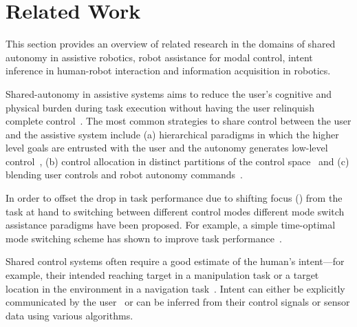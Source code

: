 \documentclass[natbib, twocolumn]{svjour3}          %
\begin{document}
\section{Related Work}\label{sec:related-work}
This section provides an overview of related research in the domains of shared autonomy in assistive robotics, robot assistance for modal control, intent inference in human-robot interaction and information acquisition in robotics. 

Shared-autonomy in assistive systems aims to reduce the user's cognitive and physical burden during task execution without having the user relinquish complete control~\citep{philips2007adaptive, demeester2008user, gopinath2017human, muelling2017autonomy}. The most common strategies to share control between the user and the assistive system include (a) hierarchical paradigms in which the higher level goals are entrusted with the user and the autonomy generates low-level control~\citep{tsui2011want, kim2010relationship, kim2012autonomy}, (b) control allocation in distinct partitions of the control space~\citep{driessen2005collaborative} and (c) blending user controls and robot autonomy commands~\citep{downey2016blending, storms2014blending, muelling2017autonomy}. 

In order to offset the drop in task performance due to shifting focus () from the task at hand to switching between different control modes different mode switch assistance paradigms have been proposed. For example, a simple time-optimal mode switching scheme has shown to improve task performance~\citep{herlant2016assistive, pilarski2012dynamic}. 


Shared control systems often require a good estimate of the human's intent---for example, their intended reaching target in a manipulation task or a target location in the environment in a navigation task~\citep{liu2016goal}. Intent can either be explicitly communicated by the user~\citep{choi2008laser} or can be inferred from their control signals or sensor data using various algorithms. 
\end{document}
